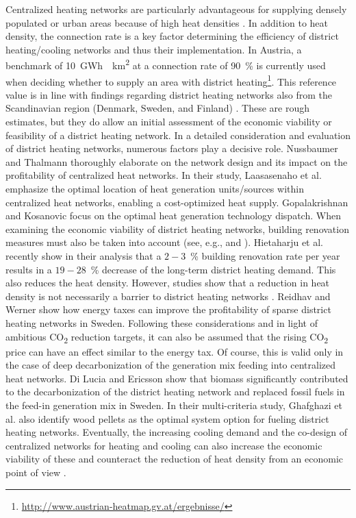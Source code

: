 Centralized heating networks are particularly advantageous for supplying densely populated or urban areas because of high heat densities \cite{inage2020development}. In addition to heat density, the connection rate is a key factor determining the efficiency of district heating/cooling networks and thus their implementation. In Austria, a benchmark of \SI{10}{GWh \per km^2} at a connection rate of \SI{90}{\%} is currently used when deciding whether to supply an area with district heating\footnote{\url{http://www.austrian-heatmap.gv.at/ergebnisse/}}. This reference value is in line with findings regarding district heating networks also from the Scandinavian region (Denmark, Sweden, and Finland) \cite{zinko2008district}. These are rough estimates, but they do allow an initial assessment of the economic viability or feasibility of a district heating network. In a detailed consideration and evaluation of district heating networks, numerous factors play a decisive role. Nussbaumer and Thalmann \cite{nussbaumer2016influence} thoroughly elaborate on the network design and its impact on the profitability of centralized heat networks. In their study, Laasasenaho et al. \cite{laasasenaho2019gis} emphasize the optimal location of heat generation units/sources within centralized heat networks, enabling a cost-optimized heat supply. Gopalakrishnan and Kosanovic \cite{gopalakrishnan2014economic} focus on the optimal heat generation technology dispatch. When examining the economic viability of district heating networks, building renovation measures must also be taken into account (see, e.g., \cite{andric2018impact} and \cite{rabani2021achieving}). Hietaharju et al. \cite{hietaharju2021stochastic} recently show in their analysis that a $2-3$\SI{}{\%} building renovation rate per year results in a $19-28$\SI{}{\%} decrease of the long-term district heating demand. This also reduces the heat density. However, studies show that a reduction in heat density is not necessarily a barrier to district heating networks \cite{persson2011heat}. Reidhav and Werner \cite{reidhav2008profitability} show how energy taxes can improve the profitability of sparse district heating networks in Sweden. Following these considerations and in light of ambitious CO\textsubscript{2} reduction targets, it can also be assumed that the rising CO\textsubscript{2} price can have an effect similar to the energy tax. Of course, this is valid only in the case of deep decarbonization of the generation mix feeding into centralized heat networks. Di Lucia and Ericsson \cite{di2014low} show that biomass significantly contributed to the decarbonization of the district heating network and replaced fossil fuels in the feed-in generation mix in Sweden. In their multi-criteria study, Ghafghazi et al. \cite{ghafghazi2010multicriteria} also identify wood pellets as the optimal system option for fueling district heating networks. Eventually, the increasing cooling demand and the co-design of centralized networks for heating and cooling can also increase the economic viability of these and counteract the reduction of heat density from an economic point of view \cite{zhang2021economic}.

